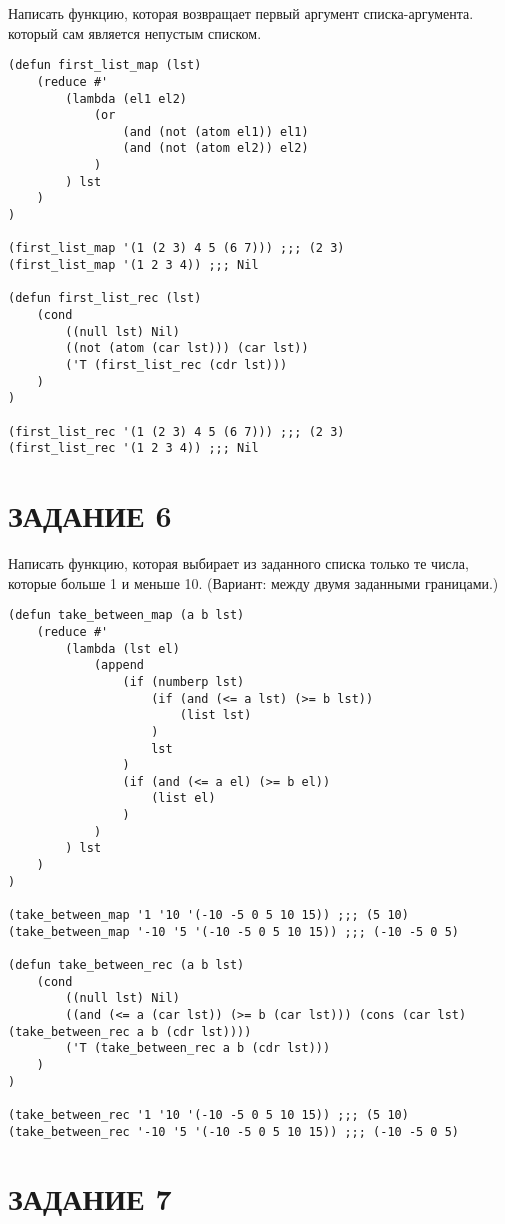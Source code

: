 Написать функцию, которая возвращает первый аргумент списка-аргумента.
который сам является непустым списком.

\begin{lstlisting}
(defun first_list_map (lst)
    (reduce #'
        (lambda (el1 el2)
            (or
                (and (not (atom el1)) el1)
                (and (not (atom el2)) el2)
            )
        ) lst
    )
)

(first_list_map '(1 (2 3) 4 5 (6 7))) ;;; (2 3)
(first_list_map '(1 2 3 4)) ;;; Nil

(defun first_list_rec (lst)
    (cond
        ((null lst) Nil)
        ((not (atom (car lst))) (car lst))
        ('T (first_list_rec (cdr lst)))
    )
)

(first_list_rec '(1 (2 3) 4 5 (6 7))) ;;; (2 3)
(first_list_rec '(1 2 3 4)) ;;; Nil
\end{lstlisting}

\section{ЗАДАНИЕ 6}

Написать функцию, которая выбирает из заданного списка только те числа,
которые больше 1 и меньше 10.
(Вариант: между двумя заданными границами.)

\begin{lstlisting}
(defun take_between_map (a b lst)
    (reduce #'
        (lambda (lst el)
            (append
                (if (numberp lst)
                    (if (and (<= a lst) (>= b lst))
                        (list lst)
                    )
                    lst
                )
                (if (and (<= a el) (>= b el))
                    (list el)
                )
            )
        ) lst
    )
)

(take_between_map '1 '10 '(-10 -5 0 5 10 15)) ;;; (5 10)
(take_between_map '-10 '5 '(-10 -5 0 5 10 15)) ;;; (-10 -5 0 5)

(defun take_between_rec (a b lst)
    (cond
        ((null lst) Nil)
        ((and (<= a (car lst)) (>= b (car lst))) (cons (car lst) (take_between_rec a b (cdr lst))))
        ('T (take_between_rec a b (cdr lst)))
    )
)

(take_between_rec '1 '10 '(-10 -5 0 5 10 15)) ;;; (5 10)
(take_between_rec '-10 '5 '(-10 -5 0 5 10 15)) ;;; (-10 -5 0 5)
\end{lstlisting}

\section{ЗАДАНИЕ 7}

